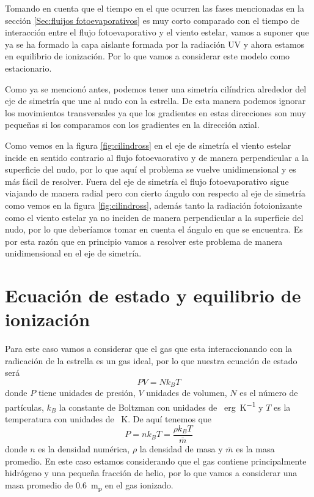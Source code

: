 \documentclass{book}
\begin{document}
Tomando en cuenta que el tiempo en el que ocurren las fases mencionadas en la sección \ref{Sec:fluijos fotoevaporativos} es muy corto comparado con el tiempo de interacción entre el flujo fotoevaporativo y el viento estelar, vamos a suponer que ya se ha formado la capa aislante formada por la radiación UV y ahora estamos en equilibrio de ionización. Por lo que vamos a considerar este modelo como estacionario. 

Como ya se mencionó antes, podemos tener una simetría cilíndrica alrededor del eje de simetría que une al nudo con la estrella. De esta manera podemos ignorar los movimientos transversales ya que los gradientes en estas direcciones son muy pequeñas si los comparamos con los gradientes en la dirección axial.

Como vemos en la figura \ref{fig:cilindross} en el eje de simetría el viento estelar incide en sentido contrario al flujo fotoevaorativo y de manera perpendicular a la superficie del nudo, por lo que aquí el problema se vuelve unidimensional y es más fácil de resolver. Fuera del eje de simetría el flujo fotoevaporativo sigue viajando de manera radial pero con cierto ángulo con respecto al eje de simetría como vemos en la figura \ref{fig:cilindross}, además tanto la radiación fotoionizante como el viento estelar ya no inciden de manera perpendicular a la superficie del nudo, por lo que deberíamos tomar en cuenta el ángulo en que se encuentra. Es por esta razón que en principio vamos a resolver este problema de manera unidimensional en el eje de simetría.


\section{Ecuación de estado y equilibrio de ionización}

Para este caso vamos a considerar que el gas que esta interaccionando con la radicación de la estrella es un gas ideal, por lo que nuestra ecuación de estado será
\[PV = Nk_BT\] donde $P$ tiene unidades de presión, $V$ unidades de volumen, $N$ es el número de partículas, $k_B$ la constante de Boltzman con unidades de \SI{}{erg.K^{-1}} y $T$ es la temperatura con unidades de \SI{}{K}. De aquí tenemos que \[P = nk_BT = \frac{\rho k_B T}{\bar{m}}\] donde $n$ es la densidad numérica, $\rho$ la densidad de masa y $\bar{m}$ es la masa promedio. En este caso estamos considerando que el gas contiene principalmente hidrógeno y una pequeña fracción de helio, por lo que vamos a considerar una masa promedio de \SI{0.6}{m_{p}} en el gas ionizado.
\end{document}
